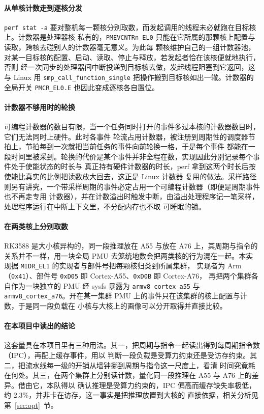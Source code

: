 \paragraph{从单核计数走到逐核分发}
\texttt{perf stat -a} 要对整机每一颗核分别取数，而发起调用的线程未必就跑在目标核上。计数器是处理器核
私有的，\texttt{PMEVCNTRn\_EL0} 只能在它所属的那颗核上配置与读取，跨核去碰别人的计数器毫无意义。为此每
颗核维护自己的一组计数器池，对某一目标核的配置、启动、读取、停止与释放，若发起者恰在该核便就地执行，否则
经一次同步的处理器间中断投递到目标核去做，发起线程阻塞到它返回，这与 Linux 用
\texttt{smp\_call\_function\_single} 把操作搬到目标核如出一辙。计数器的全局开关 \texttt{PMCR\_EL0.E}
也因此变成逐核各自置位。

\paragraph{计数器不够用时的轮换}
可编程计数器的数目有限，当一个任务同时打开的事件多过本核的计数器数目时，它们无法同时上硬件。此时各事件
轮流占用计数器，被注册到周期性的调度器节拍上，节拍每到一次就把当前任务的事件向前轮换一格，于是每个事件
都能在一段时间里被采到。轮换的代价是某个事件并非全程在数，实现因此分别记录每个事件处于使能状态的时长与
真正持有硬件计数器的时长，perf 拿到这两个时长后按使能比真实的比例把读数放大回去，这正是 Linux 计数器
复用的做法。采样路径则另有讲究，一个带采样周期的事件必定占用一个可编程计数器（即便是周期事件也不再走专用
计数器），并在计数溢出时触发中断，由溢出处理程序记一笔采样，处理程序运行在中断上下文里，不分配内存也不取
可睡眠的锁。

\paragraph{在两类核上分别取数}
RK3588 是大小核异构的，同一段推理放在 A55 与放在 A76 上，其周期与指令的关系并不一样，用一块全局 PMU
去笼统地数会把两类核的行为混在一起。本实现据 \texttt{MIDR\_EL1} 的实现者与部件号把每颗核归类到所属集群，
实现者为 Arm（\texttt{0x41}）、部件号 \texttt{0xD05} 即 Cortex-A55、\texttt{0xD0B} 即 Cortex-A76，
再把两个集群各自作为一块独立的 PMU 经 sysfs 暴露为 \texttt{armv8\_cortex\_a55} 与
\texttt{armv8\_cortex\_a76}。开在某一集群 PMU 上的事件只在该集群的核上配置与计数，于是同一段负载在
小核与大核上的画像可以分开取得并直接比较。

\paragraph{在本项目中读出的结论}
这套量具在本项目里有三种用法。其一，把周期与指令一起读出得到每周期指令数（IPC），再配上缓存事件，用以
判断一段负载是受算力约束还是受访存约束。其二，把流水线每一级的开销从墙钟挪到周期与指令这一尺度上，看清
时间究竟耗在何处。其三，在两个集群上分别读计数，量化同一段推理在 A55 与 A76 上的差异。借由它，本队得以
确认推理是受算力约束的，IPC 偏高而缓存缺失率极低，约 2.3\%，并非卡在访存，这一事实是把推理放置到大核的
直接依据，相关分析见第~\ref{sec:opt}~节。
